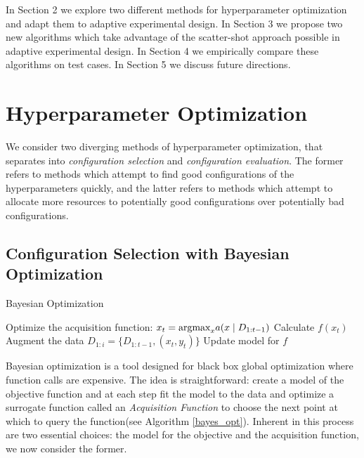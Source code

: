 \documentclass[11pt]{article}
\begin{document}
In Section 2 we explore two different methods for hyperparameter optimization and adapt them to adaptive experimental design. In Section 3 we propose two new algorithms which take advantage of the scatter-shot approach possible in adaptive experimental design. In Section 4 we empirically compare these algorithms on test cases. In Section 5 we discuss future directions.
\section{Hyperparameter Optimization}
We consider two diverging methods of hyperparameter optimization, that \cite{Li2016} separates into {\it configuration selection} and {\it configuration evaluation}. The former refers to methods which attempt to find good configurations of the hyperparameters quickly, and the latter refers to methods which attempt to allocate more resources to potentially good configurations over potentially bad configurations.

\subsection{Configuration Selection with Bayesian Optimization}


\begin{algorithm}
\scriptsize
\caption{Bayesian Optimization \cite{Brochu2010}}
\label{bayes_opt}
\begin{algorithmic}[1]
\State Optimize the acquisition function:  $x_t = \text{argmax}_x a(x \mid D_{1:t-1})$
\State Calculate $f(x_t)$
\State Augment the data $D_{1:i} = \{D_{1:t-1}, (x_t, y_t)\}$
\State Update model for $f$
\EndFor
\end{algorithmic}
\end{algorithm}

Bayesian optimization is a tool designed for black box global optimization where function calls are expensive. The idea is straightforward: create a model of the objective function and at each step fit the model to the data and optimize a surrogate function called an {\it Acquisition Function} to choose the next point at which to query the function(see Algorithm \ref{bayes_opt}). Inherent in this process are two essential choices: the model for the objective and the acquisition function, we now consider the former.
\end{document}
